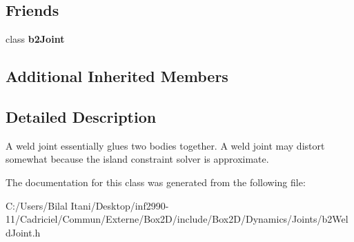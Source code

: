 \subsection*{Friends}
\begin{DoxyCompactItemize}
\item 
class {\bfseries b2\+Joint}\hypertarget{classb2_weld_joint_a54ade8ed3d794298108d7f4c4e4793fa}{}\label{classb2_weld_joint_a54ade8ed3d794298108d7f4c4e4793fa}

\end{DoxyCompactItemize}
\subsection*{Additional Inherited Members}


\subsection{Detailed Description}
A weld joint essentially glues two bodies together. A weld joint may distort somewhat because the island constraint solver is approximate. 

The documentation for this class was generated from the following file\+:\begin{DoxyCompactItemize}
\item 
C\+:/\+Users/\+Bilal Itani/\+Desktop/inf2990-\/11/\+Cadriciel/\+Commun/\+Externe/\+Box2\+D/include/\+Box2\+D/\+Dynamics/\+Joints/b2\+Weld\+Joint.\+h\end{DoxyCompactItemize}
